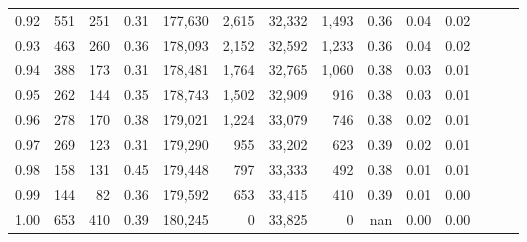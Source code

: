 \begin{tabular}{rrrrrrrrrrrrrr}
0.92 &    551 &  251 &  0.31 &  177,630 &    2,615 &  32,332 &   1,493 &  0.36 &  0.04 &      0.02 \\
0.93 &    463 &  260 &  0.36 &  178,093 &    2,152 &  32,592 &   1,233 &  0.36 &  0.04 &      0.02 \\
0.94 &    388 &  173 &  0.31 &  178,481 &    1,764 &  32,765 &   1,060 &  0.38 &  0.03 &      0.01 \\
0.95 &    262 &  144 &  0.35 &  178,743 &    1,502 &  32,909 &     916 &  0.38 &  0.03 &      0.01 \\
0.96 &    278 &  170 &  0.38 &  179,021 &    1,224 &  33,079 &     746 &  0.38 &  0.02 &      0.01 \\
0.97 &    269 &  123 &  0.31 &  179,290 &      955 &  33,202 &     623 &  0.39 &  0.02 &      0.01 \\
0.98 &    158 &  131 &  0.45 &  179,448 &      797 &  33,333 &     492 &  0.38 &  0.01 &      0.01 \\
0.99 &    144 &   82 &  0.36 &  179,592 &      653 &  33,415 &     410 &  0.39 &  0.01 &      0.00 \\
1.00 &    653 &  410 &  0.39 &  180,245 &        0 &  33,825 &       0 &   nan &  0.00 &      0.00 \\
\bottomrule
\end{tabular}
